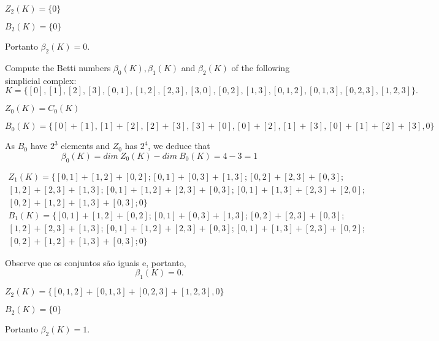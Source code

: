 $Z_2(K) = \{0\}$

$B_2(K) = \{0\}$

Portanto $\beta_2(K) = 0$. 

\noindent\linia

\begin{exercise}
    Compute the Betti numbers $\beta_0(K), \beta_1(K)$ and $\beta_2(K)$ of the
    following simplicial complex:
    $$
    K = \{[0], [1], [2], [3], [0, 1], [1, 2], [2, 3], [3, 0], [0, 2], [1, 3], [0, 1, 2], [0, 1, 3], [0, 2, 3], [1, 2, 3]\}.
    $$
\end{exercise}

$Z_0(K) = C_0(K)$

$B_0(K) = \{[0] + [1], [1] + [2], [2] + [3], [3] + [0], [0] + [2], [1] + [3],
[0] + [1] + [2] + [3], 0\}$

As $B_0$ have $2^3$ elements and $Z_0$ has $2^4$, we deduce that 
$$\beta_0(K) = dim ~Z_0(K) - dim ~B_0(K) = 4 - 3 = 1$$

\begin{multline}
    Z_1(K) = \{[0,1] + [1,2] + [0,2]; [0,1] + [0,3] + [1,3]; [0,2] + [2,3] +
    [0,3]; \\ 
    [1,2] + [2,3] + [1,3]; [0,1] + [1,2] + [2,3] + [0,3]; [0,1] + [1,3] + [2,3] + [2,0]; \\
    [0,2] + [1,2] + [1,3] + [0,3]; 0
    \}    
\end{multline}
\begin{multline}
    B_1(K) = \{[0,1] + [1,2] + [0,2]; [0,1] + [0,3] + [1,3]; [0,2] + [2,3] +
    [0,3]; \\ 
    [1,2] + [2,3] + [1,3]; 
    [0,1] + [1,2] + [2,3] + [0,3]; [0,1] + [1,3] + [2,3] + [0,2]; \\
    [0,2] + [1,2] + [1,3] + [0,3]; 0
    \}    
\end{multline}

Observe que os conjuntos são iguais e, portanto, 
$$\beta_1(K) = 0.$$

$Z_2(K) = \{[0,1,2] +[0,1,3] + [0,2,3] + [1,2,3], 0\}$

$B_2(K) = \{0\}$

Portanto $\beta_2(K) = 1$. 
